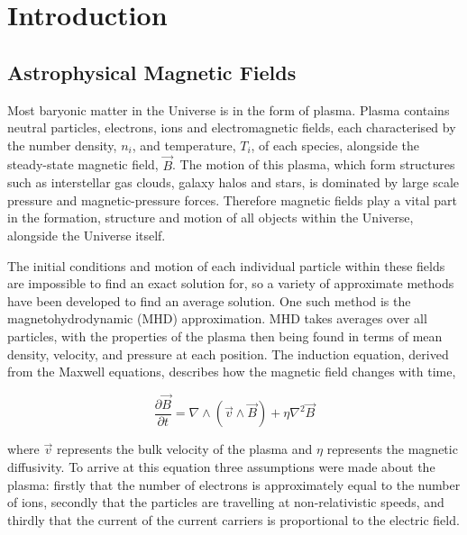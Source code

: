 \chapter{Introduction}
\label{chapt: Introduction}

\section{Astrophysical Magnetic Fields}
\label{sec: intro}



Most baryonic matter in the Universe is in the form of plasma. Plasma contains neutral particles, electrons, ions and electromagnetic fields, each characterised by the number density, $n_i$, and temperature, $T_i$, of each species, alongside the steady-state magnetic field, $\overset{\rightarrow}{B}$. The motion of this plasma, which form structures such as interstellar gas clouds, galaxy halos and stars, is dominated by large scale pressure and magnetic-pressure forces. Therefore magnetic fields play a vital part in the formation, structure and motion of all objects within the Universe, alongside the Universe itself.

The initial conditions and motion of each individual particle within these fields are impossible to find an exact solution for, so a variety of approximate methods have been developed to find an average solution. One such method is the magnetohydrodynamic (MHD) approximation. MHD takes averages over all particles, with the properties of the plasma then being found in terms of mean density, velocity, and pressure at each position. The induction equation, derived from the Maxwell equations, describes how the magnetic field changes with time, 

\begin{equation}
    \frac{\partial\Vec{B}}{\partial t} = \nabla \wedge (\Vec{v}\wedge\Vec{B})+\eta\nabla^2\Vec{B}
    \label{eq: induction}
\end{equation}

 \noindent where $\Vec{v}$ represents the bulk velocity of the plasma and $\eta$ represents the magnetic diffusivity. To arrive at this equation three assumptions were made about the plasma: firstly that the number of electrons is approximately equal to the number of ions, secondly that the particles are travelling at non-relativistic speeds, and thirdly that the current of the current carriers is proportional to the electric field.

